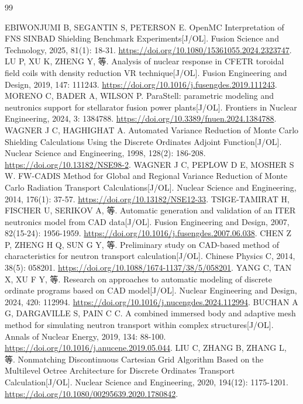 \documentclass[UTF8, zihao=-4, fontset=none, a4paper]{ctexart}
\begin{document}
\clearpage
{}
{}
\begin{thebibliography}{99}
\setlength{\itemsep}{3pt}
\raggedright
\small
{} EBIWONJUMI B, SEGANTIN S, PETERSON E. OpenMC Interpretation of FNS SINBAD Shielding Benchmark Experiments{[}J/OL{]}. Fusion Science and Technology, 2025, 81(1): 18-31. \url{https://doi.org/10.1080/15361055.2024.2323747}.
 LU P, XU K, ZHENG Y, 等. Analysis of nuclear response in CFETR toroidal field coils with density reduction VR technique{[}J/OL{]}. Fusion Engineering and Design, 2019, 147: 111243. \url{https://doi.org/10.1016/j.fusengdes.2019.111243}.
 MORENO C, BADER A, WILSON P. ParaStell: parametric modeling and neutronics support for stellarator fusion power plants{[}J/OL{]}. Frontiers in Nuclear Engineering, 2024, 3: 1384788. \url{https://doi.org/10.3389/fnuen.2024.1384788}.
 WAGNER J C, HAGHIGHAT A. Automated Variance Reduction of Monte Carlo Shielding Calculations Using the Discrete Ordinates Adjoint Function{[}J/OL{]}. Nuclear Science and Engineering, 1998, 128(2): 186-208. \url{https://doi.org/10.13182/NSE98-2}.
 WAGNER J C, PEPLOW D E, MOSHER S W. FW-CADIS Method for Global and Regional Variance Reduction of Monte Carlo Radiation Transport Calculations{[}J/OL{]}. Nuclear Science and Engineering, 2014, 176(1): 37-57. \url{https://doi.org/10.13182/NSE12-33}.
 TSIGE-TAMIRAT H, FISCHER U, SERIKOV A, 等. Automatic generation and validation of an ITER neutronics model from CAD data{[}J/OL{]}. Fusion Engineering and Design, 2007, 82(15-24): 1956-1959. \url{https://doi.org/10.1016/j.fusengdes.2007.06.038}.
 CHEN Z P, ZHENG H Q, SUN G Y, 等. Preliminary study on CAD-based method of characteristics for neutron transport calculation{[}J/OL{]}. Chinese Physics C, 2014, 38(5): 058201. \url{https://doi.org/10.1088/1674-1137/38/5/058201}.
 YANG C, TAN X, XU F Y, 等. Research on approaches to automatic modeling of discrete ordinate programs based on CAD model{[}J/OL{]}. Nuclear Engineering and Design, 2024, 420: 112994. \url{https://doi.org/10.1016/j.nucengdes.2024.112994}.
 BUCHAN A G, DARGAVILLE S, PAIN C C. A combined immersed body and adaptive mesh method for simulating neutron transport within complex structures{[}J/OL{]}. Annals of Nuclear Energy, 2019, 134: 88-100. \url{https://doi.org/10.1016/j.anucene.2019.05.044}.
 LIU C, ZHANG B, ZHANG L, 等. Nonmatching Discontinuous Cartesian Grid Algorithm Based on the Multilevel Octree Architecture for Discrete Ordinates Transport Calculation{[}J/OL{]}. Nuclear Science and Engineering, 2020, 194(12): 1175-1201. \url{https://doi.org/10.1080/00295639.2020.1780842}.

\end{thebibliography}
\end{document}
